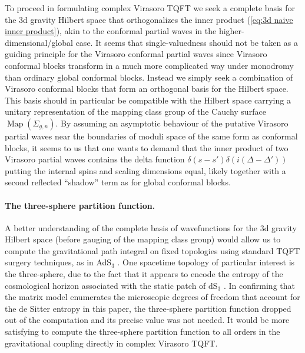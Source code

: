 \documentclass[12pt,a4paper]{article}
\begin{document}
To proceed in formulating complex Virasoro TQFT we seek a complete basis for the 3d gravity Hilbert space that orthogonalizes the inner product (\ref{eq:3d naive inner product}), akin to the conformal partial waves in the higher-dimensional/global case. It seems that single-valuedness should not be taken as a guiding principle for the Virasoro conformal partial waves since Virasoro conformal blocks transform in a much more complicated way under monodromy than ordinary global conformal blocks. Instead we simply seek a combination of Virasoro conformal blocks that form an orthogonal basis for the Hilbert space. This basis should in particular be compatible with the Hilbert space carrying a unitary representation of the mapping class group of the Cauchy surface $\mathop{\text{Map}}(\Sigma_{g,n})$. By assuming an asymptotic behaviour of the putative Virasoro partial waves near the boundaries of moduli space of the same form as conformal blocks, it seems to us that one wants to demand that the inner product of two Virasoro partial waves contains the delta function $\delta(s-s') \delta(i(\Delta-\Delta'))$ putting the internal spins and scaling dimensions equal, likely together with a second reflected ``shadow'' term as for global conformal blocks.




\paragraph{The three-sphere partition function.}
A better understanding of the complete basis of wavefunctions for the 3d gravity Hilbert space (before gauging of the mapping class group) would allow us to compute the gravitational path integral on fixed topologies using standard TQFT surgery techniques, as in AdS$_3$ \cite{Collier:2023fwi,Collier:2024mgv}. One spacetime topology of particular interest is the three-sphere, due to the fact that it appears to encode the entropy of the cosmological horizon associated with the static patch of dS$_3$ \cite{Gibbons:1976ue,Gibbons:1977mu}. In confirming that the matrix model enumerates the microscopic degrees of freedom that account for the de Sitter entropy in this paper, the three-sphere partition function dropped out of the computation and its precise value was not needed. It would be more satisfying to compute the three-sphere partition function to all orders in the gravitational coupling directly in complex Virasoro TQFT. 
\end{document}
